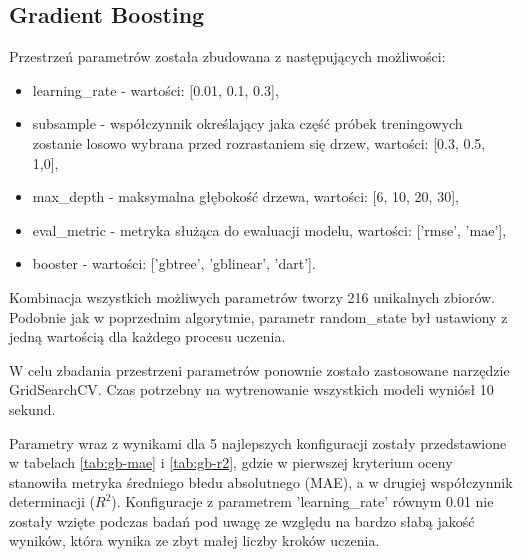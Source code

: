 \subsection{Gradient Boosting}\label{sec:gb-eval}
Przestrzeń parametrów została zbudowana z następujących możliwości:
\begin{itemize}
    \item learning\_rate - wartości: [0.01, 0.1, 0.3],
    \item subsample - współczynnik określający jaka część próbek treningowych zostanie losowo wybrana przed rozrastaniem się drzew, wartości: [0.3, 0.5, 1,0],
    \item max\_depth - maksymalna głębokość drzewa, wartości: [6, 10, 20, 30],
    \item eval\_metric - metryka służąca do ewaluacji modelu, wartości: ['rmse', 'mae'],
    \item booster - wartości: ['gbtree', 'gblinear', 'dart'].
\end{itemize}

Kombinacja wszystkich możliwych parametrów tworzy 216 unikalnych zbiorów. Podobnie jak w poprzednim algorytmie, parametr random\_state był ustawiony z jedną wartością dla każdego procesu uczenia.

W celu zbadania przestrzeni parametrów ponownie zostało zastosowane narzędzie GridSearchCV. Czas potrzebny na wytrenowanie wszystkich modeli wyniósł 10 sekund.

Parametry wraz z wynikami dla 5 najlepszych konfiguracji zostały przedstawione w tabelach \ref{tab:gb-mae} i \ref{tab:gb-r2}, gdzie w pierwszej kryterium oceny stanowiła metryka średniego błedu absolutnego (MAE), a w drugiej współczynnik determinacji ($R^{2}$). Konfiguracje z parametrem 'learning\_rate' równym 0.01 nie zostały wzięte podczas badań pod uwagę ze względu na bardzo słabą jakość wyników, która wynika ze zbyt małej liczby kroków uczenia.

